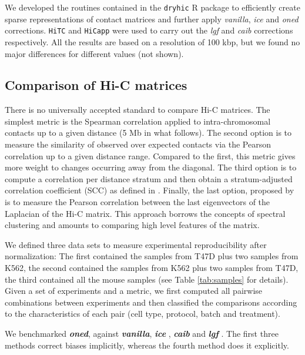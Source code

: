\documentclass{bioinfo}
\begin{document}
\begin{methods}
We developed the routines contained in the \texttt{dryhic} R package to
efficiently create sparse representations of contact matrices and further
apply \textit{vanilla}, \textit{ice} and \textit{oned} corrections.
\texttt{HiTC} \citep{servant2012hitc} and \texttt{HiCapp}
\citep{wu2016computational} were used to carry out the \textit{lgf} and
\textit{caib} corrections respectively. All the results are based on a
resolution of 100 kbp, but we found no major differences for different
values (not shown).



\subsection{Comparison of Hi-C matrices}
\label{sec:comp}

There is no universally accepted standard to compare Hi-C matrices. The
simplest metric is the Spearman correlation applied to intra-chromosomal
contacts up to a given distance (5 Mb in what follows). The second option
is to measure the similarity of observed over expected contacts via the
Pearson correlation up to a given distance range. Compared to the first,
this metric gives more weight to changes occurring away from the diagonal.
The third option is to compute a correlation per distance stratum and then
obtain a stratum-adjusted correlation coefficient (SCC) as defined in
\cite{yang2017hicrep}. Finally, the last option, proposed by
\cite{yan2017hicspector} is to measure the Pearson correlation between the
last eigenvectors of the Laplacian of the Hi-C matrix. This approach
borrows the concepts of spectral clustering \citep{von2007tutorial} and
amounts to comparing high level features of the matrix.

We defined three data sets to measure experimental reproducibility after
normalization: The first contained the samples from T47D plus two samples
from K562, the second contained the samples from K562 plus two samples
from T47D, the third contained all the mouse samples (see Table
\ref{tab:samples} for details). Given a set of experiments and a metric,
we first computed all pairwise combinations between experiments and then
classified the comparisons according to the characteristics of each pair
(cell type, protocol, batch and treatment).

We benchmarked \textbf{\textit{oned}}, against \textbf{\textit{vanilla}},
\textbf{\textit{ice}} \citep{imakaev2012iterative}, \textbf{\textit{caib}}
\citep{wu2016computational} and \textbf{\textit{lgf}}
\citep{hu2012hicnorm, servant2012hitc}. The first three methods correct
biases implicitly, whereas the fourth method does it explicitly.


\end{methods}
\end{document}
